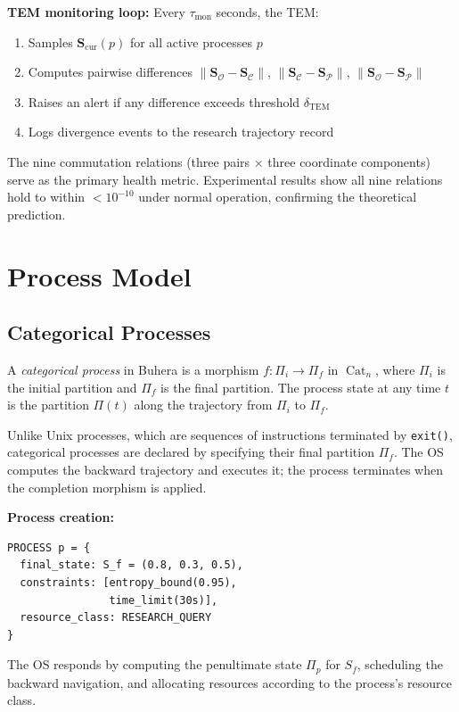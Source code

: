 \documentclass[12pt,twocolumn]{article}
\DeclareMathOperator{\Cat}{Cat}
\begin{document}
\textbf{TEM monitoring loop:} Every $\tau_{\text{mon}}$ seconds, the TEM:
\begin{enumerate}
\item Samples $\mathbf{S}_{\text{cur}}(p)$ for all active processes $p$
\item Computes pairwise differences $\|\mathbf{S}_{\mathcal{O}} - \mathbf{S}_{\mathcal{C}}\|$, $\|\mathbf{S}_{\mathcal{C}} - \mathbf{S}_{\mathcal{P}}\|$, $\|\mathbf{S}_{\mathcal{O}} - \mathbf{S}_{\mathcal{P}}\|$
\item Raises an alert if any difference exceeds threshold $\delta_{\text{TEM}}$
\item Logs divergence events to the research trajectory record
\end{enumerate}

The nine commutation relations (three pairs $\times$ three coordinate components) serve as the primary health metric. Experimental results show all nine relations hold to within $< 10^{-10}$ under normal operation, confirming the theoretical prediction.

\section{Process Model}
\label{sec:process_model}

\subsection{Categorical Processes}

A \emph{categorical process} in Buhera is a morphism $f: \Pi_i \to \Pi_f$ in $\Cat_n$, where $\Pi_i$ is the initial partition and $\Pi_f$ is the final partition. The process state at any time $t$ is the partition $\Pi(t)$ along the trajectory from $\Pi_i$ to $\Pi_f$.

Unlike Unix processes, which are sequences of instructions terminated by \texttt{exit()}, categorical processes are declared by specifying their final partition $\Pi_f$. The OS computes the backward trajectory and executes it; the process terminates when the completion morphism is applied.

\textbf{Process creation:}
\begin{verbatim}
PROCESS p = {
  final_state: S_f = (0.8, 0.3, 0.5),
  constraints: [entropy_bound(0.95),
                time_limit(30s)],
  resource_class: RESEARCH_QUERY
}
\end{verbatim}

The OS responds by computing the penultimate state $\Pi_p$ for $S_f$, scheduling the backward navigation, and allocating resources according to the process's resource class.
\end{document}

